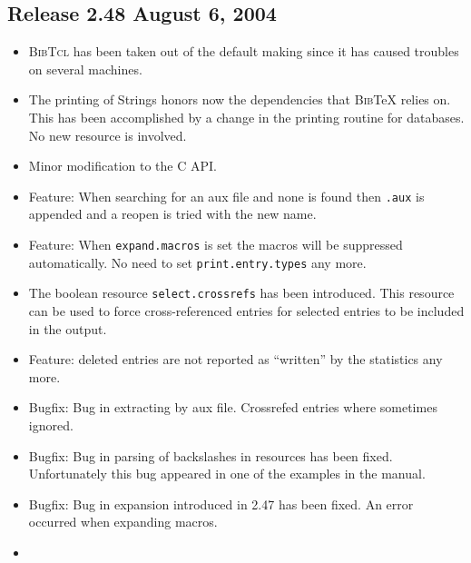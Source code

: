 \documentclass[11pt,a4paper]{scrartcl}
\newcommand\rsc[1]{\texttt{#1}}
\newcommand\BibTcl{\textsc{BibTcl}}
\newcommand\BibTeX{\textsc{Bib}\TeX}
\newenvironment{Release}[2]{%
  \def\tmp{#2}%
  \section*{Release #1 \ifx\tmp\empty\else{\normalsize[#2]}\fi}
  \begin{itemize}
}{\end{itemize}}
\newenvironment{Fix}[1]{\item }{}
\newenvironment{New}[1]{\item }{}
\newenvironment{Update}[1]{\item }{}
\begin{document}
\begin{multicols}
\begin{Release}{2.48}{August 6, 2004}
   \begin{Update}{gene}
     \BibTcl{} has been taken out of the default making since it has
     caused troubles on several machines.
   \end{Update}
   \begin{Update}{gene}
     The printing of Strings honors now the dependencies that
     \BibTeX{} relies on. This has been accomplished by a change in
     the printing routine for databases. No new resource is involved.
   \end{Update}
   \begin{Update}{gene}
     Minor modification to the C API.
   \end{Update}
  \begin{New}{gene}
    Feature: When searching for an aux file and none is found then
    \texttt{.aux} is appended and a reopen is tried with the new name.
  \end{New}
  \begin{Update}{gene}
    Feature: When \rsc{expand.macros} is set the macros will be
    suppressed automatically. No need to set \rsc{print.entry.types}
    any more.
  \end{Update}
  \begin{New}{gene}
    The boolean resource \rsc{select.crossrefs} has been introduced.
    This resource can be used to force cross-referenced entries for
    selected entries to be included in the output.
  \end{New}
  \begin{Update}{gene}
    Feature: deleted entries are not reported as "`written"' by the
    statistics any more.
  \end{Update}
  \begin{Fix}{gene}
    Bugfix: Bug in extracting by aux file. Crossrefed entries where
    sometimes ignored.
  \end{Fix}
  \begin{Fix}{gene}
    Bugfix: Bug in parsing of backslashes in resources has been fixed.
    Unfortunately this bug appeared in one of the examples in the
    manual.
  \end{Fix}
  \begin{Fix}{gene}
    Bugfix: Bug in expansion introduced in 2.47 has been fixed. An
    error occurred when expanding macros.
  \end{Fix}
  \begin{New}{gene}

\end{New}
\end{Release}
\end{multicols}
\end{document}
